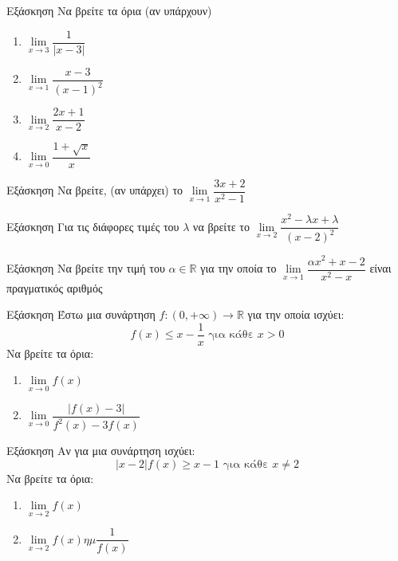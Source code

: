 \documentclass{presentation}
\begin{document}
\begin{frame}{Εξάσκηση}
  Να βρείτε τα όρια (αν υπάρχουν)
  \begin{enumerate}
    \item $\lim\limits_{x \to 3}{ \dfrac{1}{|x-3|} }$ \pause
    \item $\lim\limits_{x \to 1}{ \dfrac{x-3}{(x-1)^2} }$ \pause
    \item $\lim\limits_{x \to 2}{ \dfrac{2x+1}{x-2} }$ \pause
    \item $\lim\limits_{x \to 0}{ \dfrac{1+\sqrt{x}}{x}}$
  \end{enumerate}
\end{frame}

\begin{frame}{Εξάσκηση}
  Να βρείτε, (αν υπάρχει) το $\lim\limits_{x \to 1}{ \dfrac{3x+2}{x^2-1} }$
\end{frame}

\begin{frame}{Εξάσκηση}
  Για τις διάφορες τιμές του $λ$ να βρείτε το $\lim\limits_{x \to 2}{ \dfrac{x^2-λx+λ}{(x-2)^2} }$
\end{frame}

\begin{frame}{Εξάσκηση}
  Να βρείτε την τιμή του $α\in\mathbb{R}$ για την οποία το $\lim\limits_{x \to 1}{\dfrac{αx^2+x-2}{x^2-x}  }$ είναι πραγματικός αριθμός
\end{frame}

\begin{frame}{Εξάσκηση}
  Έστω μια συνάρτηση $f:(0,+\infty)\to\mathbb{R}$ για την οποία ισχύει:
  $$f(x)\le x-\dfrac{1}{x} \text{ για κάθε } x>0$$
  Να βρείτε τα όρια:
  \begin{enumerate}
    \item $\lim\limits_{x \to 0}{ f(x) }$ \pause
    \item $\lim\limits_{x \to 0}{ \dfrac{|f(x)-3|}{f^2(x)-3f(x)} }$
  \end{enumerate}
\end{frame}

\begin{frame}{Εξάσκηση}
  Αν για μια συνάρτηση ισχύει:
  $$|x-2|f(x)\ge x-1 \text{ για κάθε } x\ne 2$$
  Να βρείτε τα όρια:
  \begin{enumerate}
    \item $\lim\limits_{x \to 2}{ f(x) }$ \pause
    \item $\lim\limits_{x \to 2}{ f(x)ημ\dfrac{1}{f(x)} }$
  \end{enumerate}
\end{frame}
\end{document}
